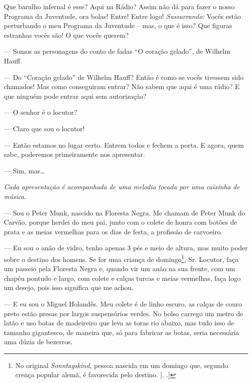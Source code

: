 \begin{myparindent}{0pt}
\begin{Parskip}
Que barulho infernal é esse? Aqui na Rádio? Assim não dá para fazer o
nosso Programa da Juventude, ora bolas! Entre! Entre logo!
\emph{Sussurrando:} Vocês estão perturbando o meu Programa da Juventude
-- mas, o que é isso? Que figuras estranhas vocês são! O que vocês
querem?

 --- Somos as personagens do conto de fadas ``O
coração gelado'', de Wilhelm Hauff.

 --- Do ``Coração gelado'' de Wilhelm Hauff? Então é como se vocês
tivessem sido chamados! Mas como conseguiram entrar?
Não sabem que aqui é uma rádio? E que ninguém pode entrar aqui sem
autorização?

 --- O senhor é o locutor?

 --- Claro que sou o locutor!

 --- Então estamos no lugar certo. Entrem todos e
fechem a porta. E agora, quem sabe, poderemos primeiramente nos
apresentar.

 --- Sim, mas\ldots{}

\emph{Cada apresentação é acompanhada de uma melodia tocada por uma
caixinha de música}.

 --- Sou o Peter Munk, nascido na Floresta Negra. Me
chamam de Peter Munk do Carvão, porque herdei do meu pai, junto com o
colete de honra com botões de prata e as meias vermelhas para os dias de
festa, a profissão de carvoeiro.

 --- Eu sou o anão de vidro, tenho apenas 3 pés e meio de
altura, mas muito poder sobre o destino dos homens. Se for uma criança
de domingo\footnote{No original \emph{Sonntagskind,} pessoa nascida em
  um domingo que, segundo crença popular alemã, é favorecida pelo
  destino. [. .]}, Sr. Locutor, faça um passeio pela Floresta
Negra e, quando vir um anão na sua frente, com um chapéu pontudo e
largo, com colete e calças turcas e meias vermelhas, faça logo um
desejo, pois isso significa que me achou.

 --- E eu sou o Miguel Holandês. Meu colete é de linho
escuro, as calças de couro preto estão presas por largos suspensórios
verdes. No bolso carrego um metro de latão e uso botas de madeireiro que
leva as toras rio abaixo, mas tudo isso de tamanho gigantesco, de
maneira que, só para fabricar as botas, seria necessária uma dúzia de
bezerros.


\end{Parskip}
\end{myparindent}
